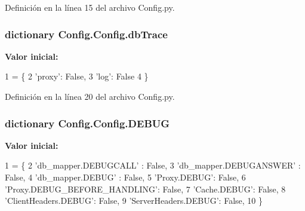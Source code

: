 Definición en la línea 15 del archivo Config.\-py.

\hypertarget{class_config_1_1_config_af7a49b43885faa51f5f5b5687a05120c}{
\subsubsection[{db\-Trace}]{\setlength{\rightskip}{0pt plus 5cm}dictionary Config.\-Config.\-db\-Trace\hspace{0.3cm}{\ttfamily [static]}}}\label{class_config_1_1_config_af7a49b43885faa51f5f5b5687a05120c}
{\bfseries Valor inicial\-:}
\begin{DoxyCode}
1 = \{
2         \textcolor{stringliteral}{'proxy'}: \textcolor{keyword}{False},
3         \textcolor{stringliteral}{'log'}: \textcolor{keyword}{False}
4     \}
\end{DoxyCode}


Definición en la línea 20 del archivo Config.\-py.

\hypertarget{class_config_1_1_config_a1d5bf72f9f7f8047bc648261155e3141}{
\subsubsection[{D\-E\-B\-U\-G}]{\setlength{\rightskip}{0pt plus 5cm}dictionary Config.\-Config.\-D\-E\-B\-U\-G\hspace{0.3cm}{\ttfamily [static]}}}\label{class_config_1_1_config_a1d5bf72f9f7f8047bc648261155e3141}
{\bfseries Valor inicial\-:}
\begin{DoxyCode}
1 = \{
2         \textcolor{stringliteral}{'db\_mapper.DEBUGCALL'} : \textcolor{keyword}{False},
3         \textcolor{stringliteral}{'db\_mapper.DEBUGANSWER'} : \textcolor{keyword}{False},
4         \textcolor{stringliteral}{'db\_mapper.DEBUG'} : \textcolor{keyword}{False},
5         \textcolor{stringliteral}{'Proxy.DEBUG'}: \textcolor{keyword}{False},
6         \textcolor{stringliteral}{'Proxy.DEBUG\_BEFORE\_HANDLING'}: \textcolor{keyword}{False},
7         \textcolor{stringliteral}{'Cache.DEBUG'}: \textcolor{keyword}{False},
8         \textcolor{stringliteral}{'ClientHeaders.DEBUG'}: \textcolor{keyword}{False},
9         \textcolor{stringliteral}{'ServerHeaders.DEBUG'}: \textcolor{keyword}{False},
10     \}
\end{DoxyCode}


